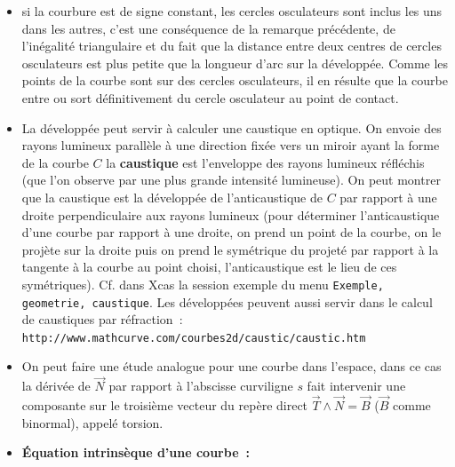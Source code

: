 \documentclass[a4paper,11pt]{book}
\begin{document}
\begin{giacjshere}
\begin{itemize}
la longueur d'arc de courbe de la d\'evelopp\'ee est donn\'ee par~:
$$ \int_{t_0}^{t_1} \left|\frac{d\frac{1}{\kappa}}{dt}\right| \ dt = 
\left| \left[\frac{1}{\kappa}\right]_{t_0}^{t_1} \right|
= |R(t_1)-R(t_0)|
$$
\\
Cons\'equence~: si on enroule un fil sur la d\'evelopp\'ee $D$,
que ce fil est tendu et que son extr\'emit\'e co\"incide, avant de
commencer \`a le d\'erouler, avec un point de la courbe $C$ 
alors dans la suite du d\'eroul\'e, l’extr\'emit\'e parcoura la courbe
$C$ (on dit que $C$ est une d\'eveloppante de $D$).
\item si la courbure est de signe constant, les cercles osculateurs
sont inclus les uns dans les autres, c'est une cons\'equence
de la remarque pr\'ec\'edente, de l'in\'egalit\'e triangulaire
et du fait que la distance entre deux centres de cercles
osculateurs est plus petite que la longueur d'arc sur la
d\'evelopp\'ee. Comme les points de la courbe sont
sur des cercles osculateurs, il en r\'esulte que la courbe
entre ou sort d\'efinitivement du cercle osculateur au point
de contact.
\item La d\'evelopp\'ee peut servir \`a calculer une caustique en
optique. On envoie des rayons lumineux parall\`ele \`a une
direction fix\'ee vers un miroir ayant la forme de la courbe $C$
la {\bf caustique} 
est l'enveloppe des rayons lumineux r\'efl\'echis
(que l'on observe par une plus grande intensit\'e lumineuse).
On peut montrer que la caustique est la d\'evelopp\'ee 
de l'anticaustique de $C$ par rapport \`a une droite perpendiculaire
aux rayons lumineux (pour d\'eterminer 
l'anticaustique d'une courbe par rapport
\`a une droite, on prend un point de la courbe, on le proj\`ete sur
la droite puis on prend le sym\'etrique du projet\'e par rapport \`a la
tangente \`a la courbe au point choisi, 
l'anticaustique est le lieu de ces sym\'etriques). 
Cf. dans Xcas la session exemple du
menu \verb|Exemple, geometrie, caustique|.
Les d\'evelopp\'ees peuvent aussi servir dans le calcul de caustiques
par r\'efraction~:
\verb|http://www.mathcurve.com/courbes2d/caustic/caustic.htm|
\item On peut faire une \'etude analogue pour une courbe dans
  l'espace, dans ce cas la d\'eriv\'ee de $\vec{N}$
par rapport \`a l'abscisse curviligne $s$ fait intervenir une
composante sur le troisi\`eme vecteur du rep\`ere direct
$\vec{T} \wedge\vec{N}=\vec{B}$ 
($\vec{B}$ comme binormal), appel\'e
torsion.
\item {\bf \'Equation intrins\`eque d'une courbe~:}\\

\end{itemize}
\end{giacjshere}
\end{document}

